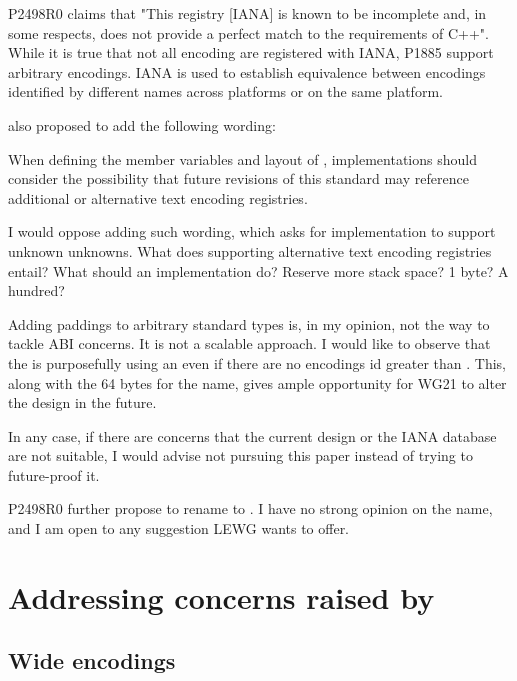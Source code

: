 \documentclass{wg21}
\begin{document}
P2498R0 claims that "This registry [IANA] is known to be incomplete and, in some respects, does not provide a perfect match to the requirements of C++".
While it is true that not all encoding are registered with IANA, P1885 support arbitrary encodings. IANA is used to establish equivalence between encodings identified by different names across platforms or on the same platform.

 also proposed to add the following wording:

\begin{quoteblock}
    When defining the member variables and layout of , implementations should consider the possibility that future revisions of this standard may reference additional or alternative text encoding registries.
\end{quoteblock}

I would oppose adding such wording, which asks for implementation to support unknown unknowns.
What does supporting alternative text encoding registries entail? What should an implementation do? Reserve more stack space? 1 byte? A hundred?

Adding paddings to arbitrary standard types is, in my opinion, not the way to tackle ABI concerns. It is not a scalable approach.
I would like to observe that the  is purposefully using an  even if there are no encodings id greater than . This, along with the 64 bytes for the name, gives ample opportunity for WG21 to alter the design in the future.

In any case, if there are concerns that the current design or the IANA database are not suitable, I would advise not pursuing this paper instead of trying to future-proof it.

P2498R0 further propose to rename  to .
I have no strong opinion on the name, and I am open to any suggestion LEWG wants to offer.

\label{P2491-concerns} \section{Addressing concerns raised by  }

\subsection{Wide encodings}
\end{document}
